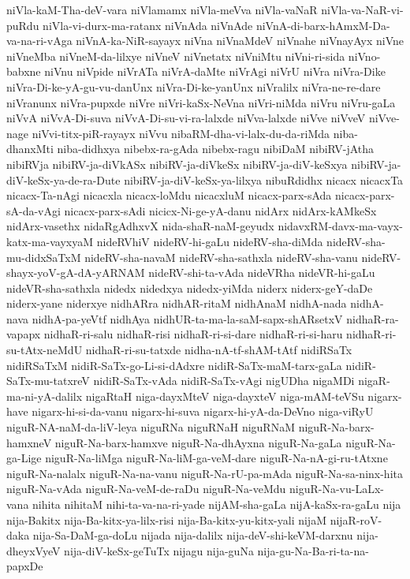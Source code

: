 {niVla-kaM-Tha-deV-vara
niVlamamx
niVla-meVva
niVla-vaNaR
niVla-va-NaR-vi-puRdu
niVla-vi-durx-ma-ratanx
niVnAda
niVnAde
niVnA-di-barx-hAmxM-Da-va-na-ri-vAga
niVnA-ka-NiR-sayayx
niVna
niVnaMdeV
niVnahe
niVnayAyx
niVne
niVneMba
niVneM-da-lilxye
niVneV
niVnetatx
niVniMtu
niVni-ri-sida
niVno-babxne
niVnu
niVpide
niVrATa
niVrA-daMte
niVrAgi
niVrU
niVra
niVra-Dike
niVra-Di-ke-yA-gu-vu-danUnx
niVra-Di-ke-yanUnx
niVralilx
niVra-ne-re-dare
niVranunx
niVra-pupxde
niVre
niVri-kaSx-NeVna
niVri-niMda
niVru
niVru-gaLa
niVvA
niVvA-Di-suva
niVvA-Di-su-vi-ra-lalxde
niVva-lalxde
niVve
niVveV
niVve-nage
niVvi-titx-piR-rayayx
niVvu
nibaRM-dha-vi-lalx-du-da-riMda
niba-dhanxMti
niba-didhxya
nibebx-ra-gAda
nibebx-ragu
nibiDaM
nibiRV-jAtha
nibiRVja
nibiRV-ja-diVkASx
nibiRV-ja-diVkeSx
nibiRV-ja-diV-keSxya
nibiRV-ja-diV-keSx-ya-de-ra-Dute
nibiRV-ja-diV-keSx-ya-lilxya
nibuRdidhx
nicacx
nicacxTa
nicacx-Ta-nAgi
nicacxla
nicacx-loMdu
nicacxluM
nicacx-parx-sAda
nicacx-parx-sA-da-vAgi
nicacx-parx-sAdi
nicicx-Ni-ge-yA-danu
nidArx
nidArx-kAMkeSx
nidArx-vasethx
nidaRgAdhxvX
nida-shaR-naM-geyudx
nidavxRM-davx-ma-vayx-katx-ma-vayxyaM
nideRVhiV
nideRV-hi-gaLu
nideRV-sha-diMda
nideRV-sha-mu-didxSaTxM
nideRV-sha-navaM
nideRV-sha-sathxla
nideRV-sha-vanu
nideRV-shayx-yoV-gA-dA-yARNAM
nideRV-shi-ta-vAda
nideVRha
nideVR-hi-gaLu
nideVR-sha-sathxla
nidedx
nidedxya
nidedx-yiMda
niderx
niderx-geY-daDe
niderx-yane
niderxye
nidhARra
nidhAR-ritaM
nidhAnaM
nidhA-nada
nidhA-nava
nidhA-pa-yeVtf
nidhAya
nidhUR-ta-ma-la-saM-sapx-shARsetxV
nidhaR-ra-vapapx
nidhaR-ri-salu
nidhaR-risi
nidhaR-ri-si-dare
nidhaR-ri-si-haru
nidhaR-ri-su-tAtx-neMdU
nidhaR-ri-su-tatxde
nidha-nA-tf-shAM-tAtf
nidiRSaTx
nidiRSaTxM
nidiR-SaTx-go-Li-si-dAdxre
nidiR-SaTx-maM-tarx-gaLa
nidiR-SaTx-mu-tatxreV
nidiR-SaTx-vAda
nidiR-SaTx-vAgi
nigUDha
nigaMDi
nigaR-ma-ni-yA-dalilx
nigaRtaH
niga-dayxMteV
niga-dayxteV
niga-mAM-teVSu
nigarx-have
nigarx-hi-si-da-vanu
nigarx-hi-suva
nigarx-hi-yA-da-DeVno
niga-viRyU
niguR-NA-naM-da-liV-leya
niguRNa
niguRNaH
niguRNaM
niguR-Na-barx-hamxneV
niguR-Na-barx-hamxve
niguR-Na-dhAyxna
niguR-Na-gaLa
niguR-Na-ga-Lige
niguR-Na-liMga
niguR-Na-liM-ga-veM-dare
niguR-Na-nA-gi-ru-tAtxne
niguR-Na-nalalx
niguR-Na-na-vanu
niguR-Na-rU-pa-mAda
niguR-Na-sa-ninx-hita
niguR-Na-vAda
niguR-Na-veM-de-raDu
niguR-Na-veMdu
niguR-Na-vu-LaLx-vana
nihita
nihitaM
nihi-ta-va-na-ri-yade
nijAM-sha-gaLa
nijA-kaSx-ra-gaLu
nija
nija-Bakitx
nija-Ba-kitx-ya-lilx-risi
nija-Ba-kitx-yu-kitx-yali
nijaM
nijaR-roV-daka
nija-Sa-DaM-ga-doLu
nijada
nija-dalilx
nija-deV-shi-keVM-darxnu
nija-dheyxVyeV
nija-diV-keSx-geTuTx
nijagu
nija-guNa
nija-gu-Na-Ba-ri-ta-na-papxDe
}
